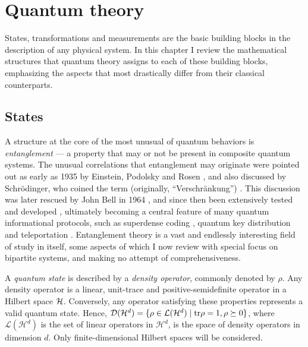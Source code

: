 
\chapter{Quantum theory}
\thispagestyle{empty}  %

	States, transformations and measurements are the basic building blocks in the description of any physical system. In this chapter I review the mathematical structures that quantum theory assigns to each of these building blocks, emphasizing the aspects that most drastically differ from their classical counterparts. 

	\section{States}

		A structure at the core of the most unusual of quantum behaviors is \emph{entanglement} --- a property that may or not be present in composite quantum systems. The unusual correlations that entanglement may originate were pointed out as early as 1935 by Einstein, Podolsky and Rosen \cite{epr}, and also discussed by Schrödinger, who coined the term (originally, ``Verschränkung'') \cite{schrodinger_1935}. This discussion was later rescued by John Bell in 1964 \cite{bell_1964}, and since then been extensively tested and developed \cite{horodecki_2009_entanglement}, ultimately becoming a central feature of many quantum informational protocols, such as superdense coding \cite{bennett_1992_superdense}, quantum key distribution \cite{bb84} and teleportation \cite{bennett_1993_teleporting}. Entanglement theory is a vast and endlessly interesting field of study in itself, some aspects of which I now review with special focus on bipartite systems, and making no attempt of comprehensiveness.
	
		A \emph{quantum state} is described by a \emph{density operator}, commonly denoted by $\rho$. Any density operator is a linear, unit-trace and positive-semidefinite operator in a Hilbert space $\mathcal{H}$. Conversely, any operator satisfying these properties represents a valid quantum state. Hence, $\mathcal{D}(\mathcal{H}^{d}) = \{ \rho \in \mathcal{L}(\mathcal{H}^d) \mid \text{tr}\rho=1, \rho \succeq0 \}$, where $\mathcal{L}(\mathcal{H}^d)$ is the set of linear operators in $\mathcal{H}^d$, is the space of density operators in dimension $d$. Only finite-dimensional Hilbert spaces will be considered.
	
